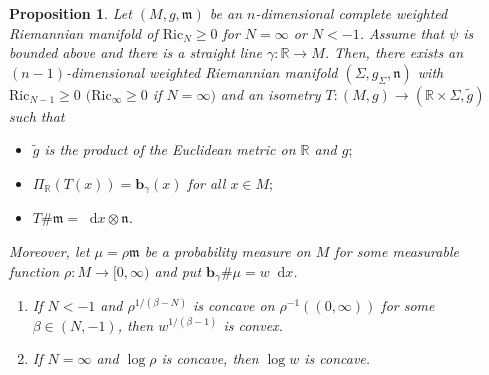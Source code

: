 \documentclass[sts]{imsart}
\newtheorem{proposition}[theorem]{Proposition}
\theoremstyle{definition}
\theoremstyle{remark}
\newcommand{\R}{\mathbb{R}}
\newcommand{\bb}{\mathbf{b}}
\newcommand{\fm}{\mathfrak{m}}
\newcommand{\fn}{\mathfrak{n}}
\newcommand{\lra}{\longrightarrow}
\newcommand{\Ric}{\mathrm{Ric}}
\newcommand*\diff{\mathop{}\!\mathrm{d}}
\begin{document}
\begin{proposition} \label{prop:proj_neg}
    Let $(M,g,\fm)$ be an $n$-dimensional complete weighted Riemannian manifold of $\Ric_N\geq 0$ for $N=\infty$ or $N<-1$.
    Assume that $\psi$ is bounded above and there is a straight line $\gamma\colon \R \lra M$.
    Then, there exists an $(n-1)$-dimensional weighted Riemannian manifold $(\Sigma,g_{\Sigma},\fn)$ with $\Ric_{N-1}\geq 0$ $(\Ric_{\infty}\geq 0$ if $N=\infty)$ and an isometry $T\colon (M,g) \lra (\R\times \Sigma,\tilde{g})$ such that
    \begin{itemize}
        \item $\tilde g$ is the product of the Euclidean metric on $\R$ and $g;$
        \item $\Pi_{\R}(T(x))=\bb_{\gamma}(x)$ for all $x\in M;$
        \item $T\#\fm =\diff x \otimes \fn$.
    \end{itemize}
    Moreover, let $\mu=\rho\fm$ be a probability measure on $M$ for some measurable function $\rho\colon M\lra [0,\infty)$ and put $\bb_{\gamma}\#\mu =w \diff x$.
    \begin{enumerate}[{\rm (i)}]
    \item\label{key'_neg}
    If $N<-1$ and $\rho^{1/(\beta -N)}$ is concave on $\rho^{-1}((0,\infty))$ for some $\beta \in (N,-1)$, then $w^{1/(\beta-1)}$ is convex.
    \item\label{key'_inf}
    If $N=\infty$ and $\log\rho$ is concave, then $\log w$ is concave.
    \end{enumerate}
\end{proposition}
\end{document}
